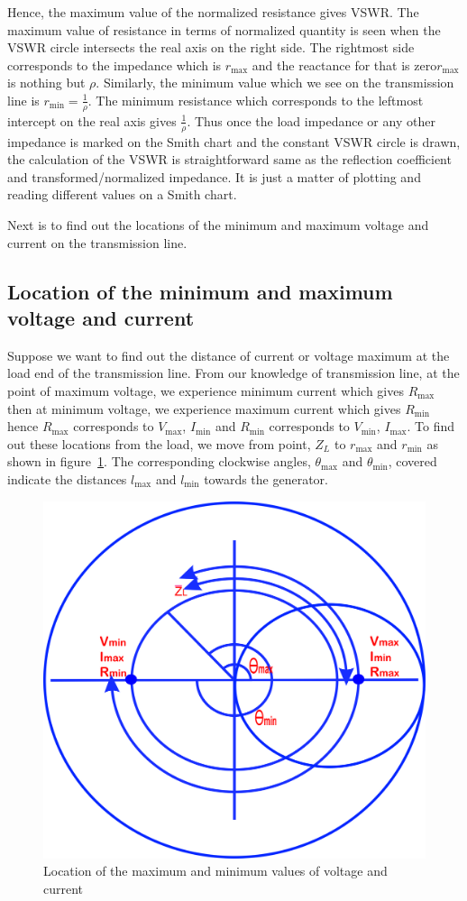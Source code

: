 Hence, the maximum value of the normalized resistance gives VSWR. The maximum value of resistance in terms of normalized quantity is seen when the VSWR circle intersects the real axis on the right side. The rightmost side corresponds to the impedance which is $r_\max$ and the reactance for that is zero\textemdash\;$r_\max$ is nothing but $\rho$. Similarly, the minimum value which we see on the transmission line is $r_\min = \frac{1}{\rho}$. The minimum resistance which corresponds to the leftmost intercept on the real axis gives $\frac{1}{\rho}$. Thus once the load impedance or any other impedance is marked on the Smith chart and the constant VSWR circle is drawn, the calculation of the VSWR is straightforward same as the reflection coefficient and transformed/normalized impedance. It is just a matter of plotting and reading different values on a Smith chart.

Next is to find out the locations of the minimum and maximum voltage and current on the transmission line. 

\subsection{Location of the minimum and maximum voltage and current}
Suppose we want to find out the distance of current or voltage maximum at the load end of the transmission line. From our knowledge of transmission line, at the point of maximum voltage, we experience minimum current which gives $R_\max$ then at minimum voltage, we experience maximum current which gives $R_\min$ hence $R_\max$ corresponds to $V_\max$, $I_\min$ and $R_\min$ corresponds to $V_\min$, $I_\max$. To find out these locations from the load, we move from point, $Z_L$ to $r_\max$ and $r_\min$ as shown in figure~\ref{fig:lkjtresx}. The corresponding clockwise angles, $\theta_\max$ and $\theta_\min$, covered indicate the distances $l_\max$ and $l_\min$ towards the generator.
\begin{figure}[h]
\centering
\includegraphics[width=0.7\linewidth]{./graphics/lkjtresx}
\caption{Location of the maximum and minimum values of voltage and current}
\label{fig:lkjtresx}
\end{figure}

